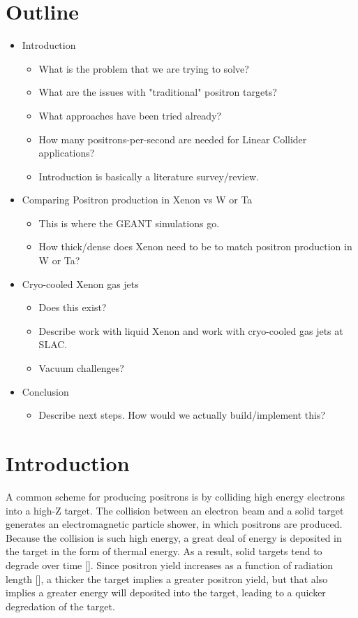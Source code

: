 \documentclass[%
reprint,
amsmath, amssymb,
aps,
]{revtex4-2}
\begin{document}
\section{Outline}
\begin{itemize}
    \item Introduction
    \begin{itemize}
        \item What is the problem that we are trying to solve?
        \item What are the issues with "traditional" positron targets?
        \item What approaches have been tried already?
        \item How many positrons-per-second are needed for Linear Collider applications?
        \item Introduction is basically a literature survey/review.
    \end{itemize}
    \item Comparing Positron production in Xenon vs W or Ta
    \begin{itemize}
        \item This is where the GEANT simulations go.
        \item How thick/dense does Xenon need to be to match positron production in W or Ta?
    \end{itemize}
    \item Cryo-cooled Xenon gas jets
    \begin{itemize}
        \item Does this exist?
        \item Describe work with liquid Xenon and work with cryo-cooled gas jets at SLAC.
        \item Vacuum challenges?
    \end{itemize}
    \item Conclusion
    \begin{itemize}
        \item Describe next steps. How would we actually build/implement this?
    \end{itemize}
    
\end{itemize}

\section{Introduction}
A common scheme for producing positrons is by colliding high energy electrons into a high-Z target.
The collision between an electron beam and a solid target generates an electromagnetic particle shower,
in which positrons are produced.
Because the collision is such high energy, a great deal of energy is deposited in the target in the form of
thermal energy.  As a result, solid targets tend to degrade over time [].  Since positron yield increases as a
function of radiation length [], a thicker the target implies a greater positron yield, but that also implies
a greater energy will deposited into the target, leading to a quicker degredation of the target.
\end{document}
